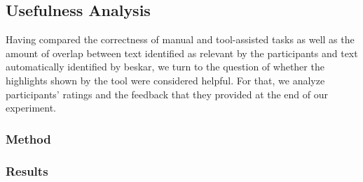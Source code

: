 
\clearpage

\subsection{Usefulness Analysis}
\label{cp6:usefulness}


Having compared the correctness of manual and tool-assisted tasks as well 
as the amount of overlap between text identified as relevant by the participants and 
text automatically identified by \acs{beskar}, we turn to the question of 
whether the highlights shown by the tool were considered helpful. 
For that, we analyze participants' ratings and the feedback that they 
provided at the end of our experiment.



\subsubsection{Method}








\subsubsection{Results}







